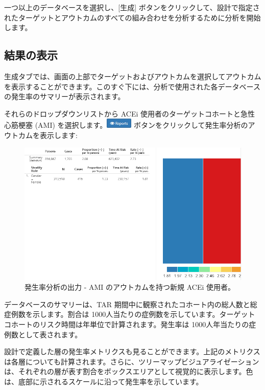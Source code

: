 \documentclass[
  11pt]{book}
\theoremstyle{definition}
\theoremstyle{definition}
\theoremstyle{definition}
\theoremstyle{definition}
\theoremstyle{remark}
\begin{document}
一つ以上のデータベースを選択し、{[}生成{]} ボタンをクリックして、設計で指定されたターゲットとアウトカムのすべての組み合わせを分析するために分析を開始します。

\subsection{結果の表示}\label{ux7d50ux679cux306eux8868ux793a-1}

生成タブでは、画面の上部でターゲットおよびアウトカムを選択してアウトカムを表示することができます。このすぐ下には、分析で使用された各データベースの発生率のサマリーが表示されます。

それらのドロップダウンリストから ACEi 使用者のターゲットコホートと急性心筋梗塞 (AMI) を選択します。\includegraphics{images/Characterization/atlasIncidenceReportButton.png} ボタンをクリックして発生率分析のアウトカムを表示します:

\begin{figure}

{\centering \includegraphics[width=1\linewidth]{images/Characterization/atlasIncidenceResults} 

}

\caption{発生率分析の出力 - AMI のアウトカムを持つ新規 ACEi 使用者。}\label{fig:atlasIncidenceResults}
\end{figure}

データベースのサマリーは、TAR 期間中に観察されたコホート内の総人数と総症例数を示します。割合は 1000人当たりの症例数を示しています。ターゲットコホートのリスク時間は年単位で計算されます。発生率は 1000人年当たりの症例数として表されます。

設計で定義した層の発生率メトリクスも見ることができます。上記のメトリクスは各層についても計算されます。さらに、ツリーマップビジュアライゼーションは、それぞれの層が表す割合をボックスエリアとして視覚的に表示します。色は、底部に示されるスケールに沿って発生率を示しています。
\end{document}
